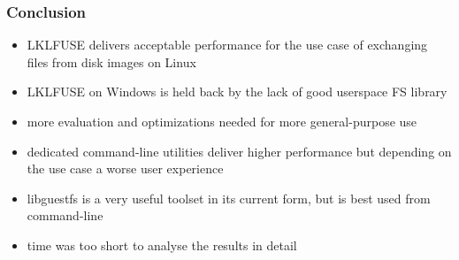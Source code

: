 

\begin{frame}

\frametitle{Conclusion}
\begin{itemize}
    \item LKLFUSE delivers acceptable performance for the use case of exchanging files from disk images on Linux
    \item LKLFUSE on Windows is held back by the lack of good userspace FS library
    \item more evaluation and optimizations needed for more general-purpose use
    \item dedicated command-line utilities deliver higher performance but depending on the use case a worse user experience
    \item libguestfs is a very useful toolset in its current form, but is best used from command-line
    \item time was too short to analyse the results in detail
\end{itemize}



\end{frame}
